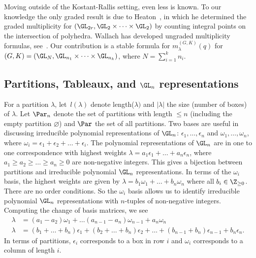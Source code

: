 Moving outside of the Kostant-Rallis setting, even less is known. To our knowledge the only graded result is due to Heaton~\cite{heaton2023graded}, in which he determined the graded multiplicity for $(\GL_{2r}, \GL_2 \times \dots \times \GL_2)$ by counting integral points on the intersection of polyhedra. Wallach has developed ungraded multiplicity formulas, see~\cite{Wallach2017, Wallach2017-2}. Our contribution is a stable formula for $m_\lambda^{(G, K)}(q)$ for $(G,K) = (\GL_N, \GL_{n_1} \times \dots \times \GL_{n_k})$, where $N = \sum_{i=1}^k n_i$.


\subsection{Partitions, Tableaux, and \texorpdfstring{\normalfont $\GL_n$}{GLn} representations }

For a partition $\lambda$, let~$l(\lambda)$ denote length($\lambda)$ and $|\lambda|$ the size (number of boxes) of $\lambda$. Let $\Par_n$ denote the set of partitions with length $\leq n$ (including the empty partition $\varnothing$) and $\Par$ the set of all partitions. Two bases are useful in discussing irreducible polynomial representations of $\GL_n$: $\epsilon_1, \dots , \epsilon_n$  and $\omega_1, \dots , \omega_n$, where $\omega_i = \epsilon_1 + \epsilon_2 + \dots + \epsilon_i$. The polynomial representations of $\GL_n$ are in one to one correspondence with highest weights $\lambda = a_1\epsilon_1 + \dots + a_n \epsilon_n$, where $a_1 \geq a_2 \geq \dots \geq a_n \geq 0$ are non-negative integers. This gives a bijection between partitions and irreducible polynomial $\GL_n$ representations. In terms of the $\omega_i$ basis, the highest weights are given by $\lambda = b_1 \omega_1 + \dots + b_n \omega_n$ where all $b_i \in \Z_{\geq 0}$. There are no order conditions. So the $\omega_i$ basis allows us to identify irreducible polynomial $\GL_n$ representations with $n$-tuples of non-negative integers. Computing the change of basis matrices, we see
\begin{align*}
\lambda &= (a_1 - a_2)\omega_1 + \dots (a_{n-1} - a_n)\omega_{n-1} + a_n \omega_n\\
\lambda &= (b_1 + \dots + b_n) \epsilon_1 + (b_2 + \dots + b_n) \epsilon_2 + \dots + (b_{n-1} + b_n)\epsilon_{n-1} + b_n \epsilon_n.
\end{align*}
In terms of partitions, $\epsilon_i$ corresponds to a box in row $i$ and $\omega_i$ corresponds to a column of length $i$.


